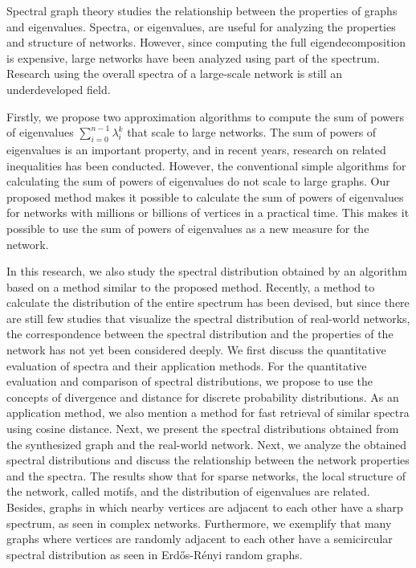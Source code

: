 \documentclass[senior,final,11pt]{iscs-thesis}
\date{January 29, 2021}
\begin{document}
\begin{eabstract}
    Spectral graph theory studies the relationship between the properties of graphs and eigenvalues. Spectra, or eigenvalues, are useful for analyzing the properties and structure of networks. However, since computing the full eigendecomposition is expensive, large networks have been analyzed using part of the spectrum. Research using the overall spectra of a large-scale network is still an underdeveloped field.

    Firstly, we propose two approximation algorithms to compute the sum of powers of eigenvalues $\sum_{i=0}^{n-1} \lambda_i^k$ that scale to large networks. The sum of powers of eigenvalues is an important property, and in recent years, research on related inequalities has been conducted. However, the conventional simple algorithms for calculating the sum of powers of eigenvalues do not scale to large graphs. Our proposed method makes it possible to calculate the sum of powers of eigenvalues for networks with millions or billions of vertices in a practical time. This makes it possible to use the sum of powers of eigenvalues as a new measure for the network.

    In this research, we also study the spectral distribution obtained by an algorithm based on a method similar to the proposed method. Recently, a method to calculate the distribution of the entire spectrum has been devised, but since there are still few studies that visualize the spectral distribution of real-world networks, the correspondence between the spectral distribution and the properties of the network has not yet been considered deeply. We first discuss the quantitative evaluation of spectra and their application methods. For the quantitative evaluation and comparison of spectral distributions, we propose to use the concepts of divergence and distance for discrete probability distributions. As an application method, we also mention a method for fast retrieval of similar spectra using cosine distance. Next, we present the spectral distributions obtained from the synthesized graph and the real-world network. Next, we analyze the obtained spectral distributions and discuss the relationship between the network properties and the spectra. The results show that for sparse networks, the local structure of the network, called motifs, and the distribution of eigenvalues are related. Besides, graphs in which nearby vertices are adjacent to each other have a sharp spectrum, as seen in complex networks. Furthermore, we exemplify that many graphs where vertices are randomly adjacent to each other have a semicircular spectral distribution as seen in Erdős-Rényi random graphs.


\end{eabstract}
\end{document}
